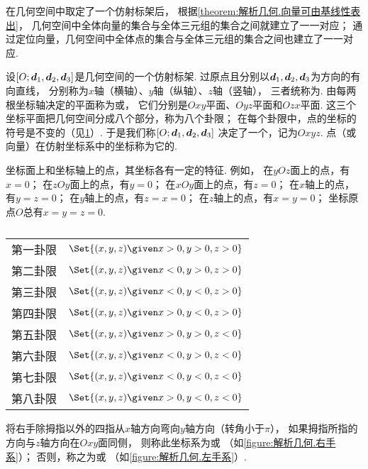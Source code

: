 在几何空间中取定了一个仿射标架后，
根据\cref{theorem:解析几何.向量可由基线性表出}，
几何空间中全体向量的集合与全体三元组的集合之间就建立了一一对应；
通过定位向量，几何空间中全体点的集合与全体三元组的集合之间也建立了一一对应.

设\([O;\boldsymbol{d}_1,\boldsymbol{d}_2,\boldsymbol{d}_3]\)是几何空间的一个仿射标架.
过原点且分别以\(\boldsymbol{d}_1,\boldsymbol{d}_2,\boldsymbol{d}_3\)为方向的有向直线，
分别称为\(x\)轴（横轴）、\(y\)轴（纵轴）、\(z\)轴（竖轴），
三者统称为.
由每两根坐标轴决定的平面称为或，
它们分别是\(Oxy\)平面、\(Oyz\)平面和\(Ozx\)平面.
这三个坐标平面把几何空间分成八个部分，称为八个卦限；
在每个卦限中，点的坐标的符号是不变的（见\cref{table:解析几何.几何空间的八个卦限}）.
于是我们称\([O;\boldsymbol{d}_1,\boldsymbol{d}_2,\boldsymbol{d}_3]\)
决定了一个，记为\(Oxyz\).
点（或向量）在仿射坐标系中的坐标称为它的.

坐标面上和坐标轴上的点，其坐标各有一定的特征.
例如，
在\(yOz\)面上的点，有\(x=0\)；
在\(zOy\)面上的点，有\(y=0\)；
在\(xOy\)面上的点，有\(z=0\)；
在\(x\)轴上的点，有\(y=z=0\)；
在\(y\)轴上的点，有\(z=x=0\)；
在\(z\)轴上的点，有\(x=y=0\)；
坐标原点\(O\)总有\(x=y=z=0\).

\begin{table}
\centering
\def\guaxian#1#2#3{\Set{ (x,y,z) \given x #1 0, y #2 0, z #3 0 }}%
\def\arraystretch{1.2}%
\begin{tabular}{cl}%
第一卦限 & \(\guaxian{>}{>}{>}\) \\
第二卦限 & \(\guaxian{<}{>}{>}\) \\
第三卦限 & \(\guaxian{<}{<}{>}\) \\
第四卦限 & \(\guaxian{>}{<}{>}\) \\
第五卦限 & \(\guaxian{>}{>}{<}\) \\
第六卦限 & \(\guaxian{<}{>}{<}\) \\
第七卦限 & \(\guaxian{<}{<}{<}\) \\
第八卦限 & \(\guaxian{>}{<}{<}\) \\
\end{tabular}%
\caption{}
\label{table:解析几何.几何空间的八个卦限}
\end{table}

将右手除拇指以外的四指从\(x\)轴方向弯向\(y\)轴方向（转角小于\(\pi\)），
如果拇指所指的方向与\(z\)轴方向在\(Oxy\)面同侧，
则称此坐标系为或
（如\cref{figure:解析几何.右手系}）；
否则，称之为或
（如\cref{figure:解析几何.左手系}）.

